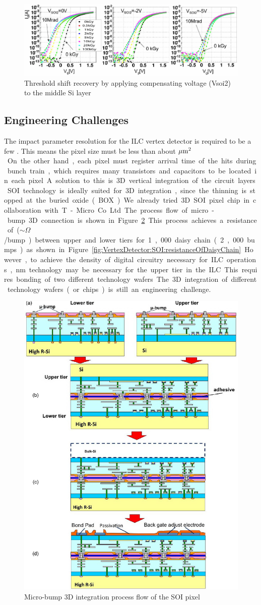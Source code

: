 \begin{figure}
\centering
\includegraphics[width=.5\textwidth]{VertexDetector/SOI/thresholdShift}
\caption{Threshold shift recovery by applying compensating voltage (Vsoi2) to the middle Si layer}
\label{fig:VertexDetector:SOI:thresholdShift}
\end{figure}

\subsection{Engineering Challenges}
The impact parameter resolution for the ILC vertex detector is required to be a few \micron. This means the pixel size must be less than about \unit[20]{$\mu\mathrm{m}^2$}. On the other hand, each pixel must register arrival time of the hits during bunch train, which requires many transistors and capacitors to be located in each pixel.
A solution to this is 3D vertical integration of the circuit layers. SOI technology is ideally suited for 3D integration, since the thinning is stopped at the buried oxide (BOX). We already tried 3D SOI pixel chip in collaboration with T-Micro Co. Ltd. The process flow of micro-bump 3D connection is shown in Figure~\ref{fig:VertexDetector:SOI:microbump3D}. This process achieves a resistance of ($\sim$\unit[6]{$\Omega$}/bump) between upper and lower tiers for 1,000 daisy chain (2,000 bumps) as shown in Figure~\ref{fig:VertexDetector:SOI:resistanceOfDaisyChain}.
However, to achieve the density of digital circuitry necessary for ILC operations, \unit[32]{nm} technology may be necessary for the upper tier in the ILC. This requires bonding of two different technology wafers. The 3D integration of different technology wafers (or chips) is still an engineering challenge.

\begin{figure}
\centering
\includegraphics[width=.5\textwidth]{VertexDetector/SOI/microBump3DIntegration}
\caption{Micro-bump 3D integration process flow of the SOI pixel}
\label{fig:VertexDetector:SOI:microbump3D}
\end{figure}


